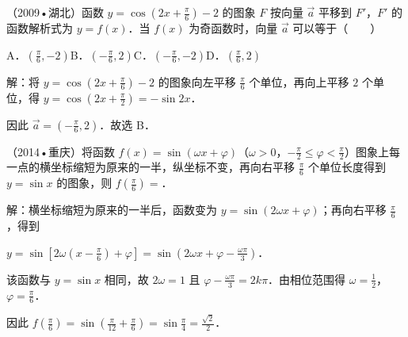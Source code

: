 \begin{question}
（2009•湖北）函数 $y=\cos(2x+\frac{\pi}{6})-2$ 的图象 $F$ 按向量 $\vec a$ 平移到 $F'$，$F'$ 的函数解析式为 $y=f(x)$．当 $f(x)$ 为奇函数时，向量 $\vec a$ 可以等于（　　）\par
A．$(\frac{\pi}{6},-2)$\qquad B．$(-\frac{\pi}{6},2)$\qquad C．$(-\frac{\pi}{6},-2)$\qquad D．$(\frac{\pi}{6},2)$\par
\begin{solution}
解：将 $y=\cos(2x+\frac{\pi}{6})-2$ 的图象向左平移 $\frac{\pi}{6}$ 个单位，再向上平移 $2$ 个单位，得 $y=\cos(2x+\frac{\pi}{2})=-\sin 2x$．\par
因此 $\vec a=(-\frac{\pi}{6},2)$．故选 B．\par
\end{solution}
\end{question}

\begin{question}
（2014•重庆）将函数 $f(x)=\sin(\omega x+\varphi)$（$\omega>0$，$-\frac{\pi}{2}\leq\varphi<\frac{\pi}{2}$）图象上每一点的横坐标缩短为原来的一半，纵坐标不变，再向右平移 $\frac{\pi}{6}$ 个单位长度得到 $y=\sin x$ 的图象，则 $f(\frac{\pi}{6})=$．\par
\begin{solution}
解：横坐标缩短为原来的一半后，函数变为 $y=\sin(2\omega x+\varphi)$；再向右平移 $\frac{\pi}{6}$，得到\par
$y=\sin[2\omega(x-\frac{\pi}{6})+\varphi]=\sin(2\omega x+\varphi-\frac{\omega\pi}{3})$．\par
该函数与 $y=\sin x$ 相同，故 $2\omega=1$ 且 $\varphi-\frac{\omega\pi}{3}=2k\pi$．由相位范围得 $\omega=\frac12$，$\varphi=\frac{\pi}{6}$．\par
因此 $f(\frac{\pi}{6})=\sin(\frac{\pi}{12}+\frac{\pi}{6})=\sin\frac{\pi}{4}=\frac{\sqrt2}{2}$．\par
\end{solution}
\end{question}

